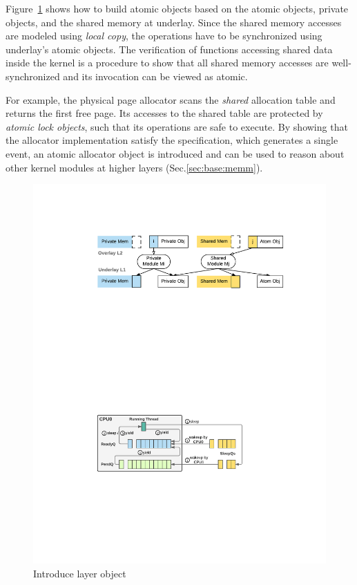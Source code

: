 Figure~\ref{fig:spec:object} shows how to build atomic objects
based on the atomic objects, private objects,
and the shared memory at underlay.
Since the shared memory accesses are modeled using \emph{local copy},
the  operations have to be synchronized 
using underlay's atomic objects.
The verification of functions accessing shared data inside the kernel
is a procedure to show that all shared memory accesses 
are well-synchronized and its invocation can be viewed as atomic.

For example, the physical page allocator scans the \emph{shared} allocation table
and returns the first free page.
Its accesses to the shared table are protected by \emph{atomic lock objects},
such that its  operations are safe to execute.
By showing that the allocator implementation
satisfy the specification, which generates a single  event,
an atomic allocator object is introduced and can be used to reason about
other kernel modules at higher layers (\cf Sec.\ref{sec:base:memm}).

\begin{figure}
\begin{center}
\includegraphics[scale=0.6]{figs/build_object}
\vspace*{-8pt}	
\end{center}
\caption{Introduce layer object}
\label{fig:spec:object}
\vspace*{-10pt}
\end{figure}


